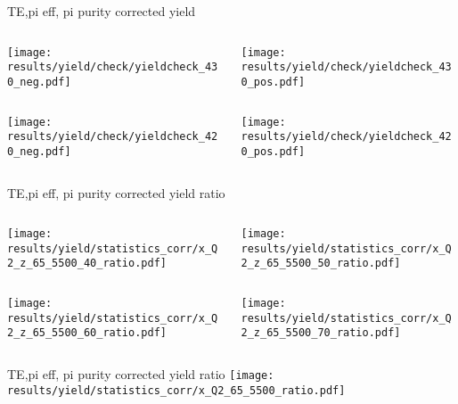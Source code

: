 \begin{frame}{TE,pi eff, pi purity corrected yield}
\begin{columns}
\begin{column}[T]{0.5\textwidth}
\texttt{[image: results/yield/check/yieldcheck\_430\_neg.pdf]}
\end{column}
\begin{column}[T]{0.5\textwidth}
\texttt{[image: results/yield/check/yieldcheck\_430\_pos.pdf]}
\end{column}
\end{columns}
\begin{columns}
\begin{column}[T]{0.5\textwidth}
\texttt{[image: results/yield/check/yieldcheck\_420\_neg.pdf]}
\end{column}
\begin{column}[T]{0.5\textwidth}
\texttt{[image: results/yield/check/yieldcheck\_420\_pos.pdf]}
\end{column}
\end{columns}
\end{frame}
\begin{frame}{TE,pi eff, pi purity corrected yield ratio}
\begin{columns}
\begin{column}[T]{0.5\textwidth}
\texttt{[image: results/yield/statistics\_corr/x\_Q2\_z\_65\_5500\_40\_ratio.pdf]}
\end{column}
\begin{column}[T]{0.5\textwidth}
\texttt{[image: results/yield/statistics\_corr/x\_Q2\_z\_65\_5500\_50\_ratio.pdf]}
\end{column}
\end{columns}
\begin{columns}
\begin{column}[T]{0.5\textwidth}
\texttt{[image: results/yield/statistics\_corr/x\_Q2\_z\_65\_5500\_60\_ratio.pdf]}
\end{column}
\begin{column}[T]{0.5\textwidth}
\texttt{[image: results/yield/statistics\_corr/x\_Q2\_z\_65\_5500\_70\_ratio.pdf]}
\end{column}
\end{columns}
\end{frame}
\begin{frame}{TE,pi eff, pi purity corrected yield ratio}
\texttt{[image: results/yield/statistics\_corr/x\_Q2\_65\_5500\_ratio.pdf]}
\end{frame}
